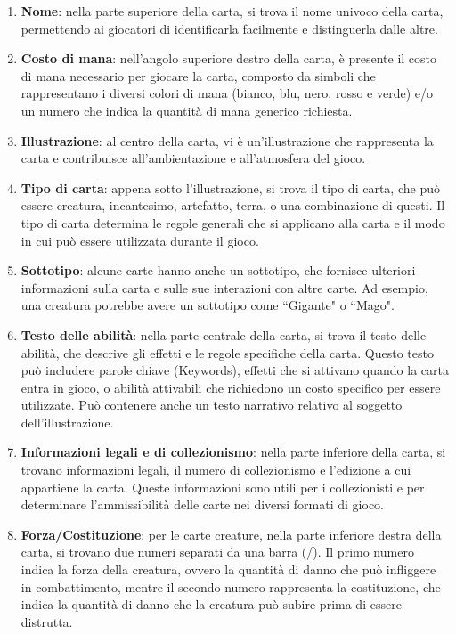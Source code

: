 \begin{enumerate}[label=\alph*.]
    \item \textbf{Nome}: nella parte superiore della carta, si trova il nome univoco della carta, permettendo ai giocatori di identificarla facilmente e distinguerla dalle altre. 
    
    \item \textbf{Costo di mana}: nell'angolo superiore destro della carta, è presente il costo di mana necessario per giocare la carta, composto da simboli che rappresentano i diversi colori di mana (bianco, blu, nero, rosso e verde) e/o un numero che indica la quantità di mana generico richiesta.
    
    \item \textbf{Illustrazione}: al centro della carta, vi è un'illustrazione che rappresenta la carta e contribuisce all'ambientazione e all'atmosfera del gioco. 
    
    \item \textbf{Tipo di carta}: appena sotto l'illustrazione, si trova il tipo di carta, che può essere creatura, incantesimo, artefatto, terra, o una combinazione di questi. Il tipo di carta determina le regole generali che si applicano alla carta e il modo in cui può essere utilizzata durante il gioco. 
    
    \item \textbf{Sottotipo}: alcune carte hanno anche un sottotipo, che fornisce ulteriori informazioni sulla carta e sulle sue interazioni con altre carte. Ad esempio, una creatura potrebbe avere un sottotipo come ``Gigante" o ``Mago". 
    
    \item \textbf{Testo delle abilità}: nella parte centrale della carta, si trova il testo delle abilità, che descrive gli effetti e le regole specifiche della carta. Questo testo può includere parole chiave (Keywords), effetti che si attivano quando la carta entra in gioco, o abilità attivabili che richiedono un costo specifico per essere utilizzate. Può contenere anche un testo narrativo relativo al soggetto dell'illustrazione.
    
    \item \textbf{Informazioni legali e di collezionismo}: nella parte inferiore della carta, si trovano informazioni legali, il numero di collezionismo e l'edizione a cui appartiene la carta. Queste informazioni sono utili per i collezionisti e per determinare l'ammissibilità delle carte nei diversi formati di gioco. 
    
    \item \textbf{Forza/Costituzione}: per le carte creature, nella parte inferiore destra della carta, si trovano due numeri separati da una barra (/). Il primo numero indica la forza della creatura, ovvero la quantità di danno che può infliggere in combattimento, mentre il secondo numero rappresenta la costituzione, che indica la quantità di danno che la creatura può subire prima di essere distrutta.     
\end{enumerate}


